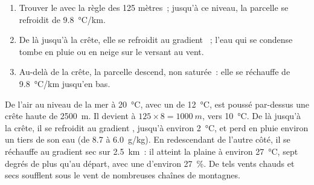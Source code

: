 \begin{method}\label{met:g10:why-clouds-form:mountain}
\begin{enumerate}
  \item Trouver le  avec la règle des 125 mètres~;
        jusqu'à ce niveau, la parcelle se refroidit de
        \qty{9.8}{\degreeCelsius/km}.
  \item De là jusqu'à la crête, elle se refroidit au gradient ~;
        l'eau qui se condense tombe en pluie ou en neige sur le versant au
        vent.
  \item Au-delà de la crête, la parcelle descend, non saturée~: elle se
        réchauffe de \qty{9.8}{\degreeCelsius/km} jusqu'en bas.
\end{enumerate}
\end{method}

\begin{example}\label{ex:g10:why-clouds-form:lee}
De l'air au niveau de la mer à \qty{20}{\degreeCelsius}, avec un  de \qty{12}{\degreeCelsius}, est poussé par-dessus une crête haute de
\qty{2500}{m}. Il devient  à $125 \times 8 = \qty{1000}{m}$, vers
\qty{10}{\degreeCelsius}. De là jusqu'à la crête, il se refroidit au
gradient , jusqu'à environ \qty{2}{\degreeCelsius}, et perd en pluie
environ un tiers de son eau (de \num{8.7} à \qty{6.0}{g/kg}). En
redescendant de l'autre côté, il se réchauffe au gradient sec sur
\qty{2.5}{km}~: il atteint la plaine à environ \qty{27}{\degreeCelsius},
sept degrés de plus qu'au départ, avec une  d'environ
\qty{27}{\percent}. De tels vents chauds et secs soufflent sous le vent de
nombreuses chaînes de montagnes.
\end{example}

